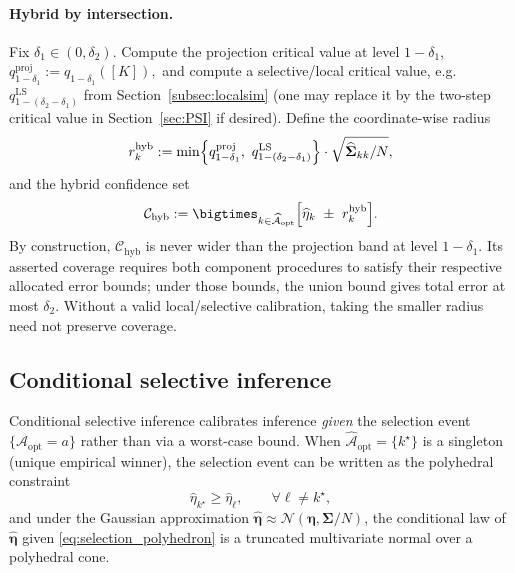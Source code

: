 \documentclass[12pt]{article}
\theoremstyle{remark}\newtheorem{remark}[theorem]{Remark}\theoremstyle{plain}
\begin{document}
\paragraph{Hybrid by intersection.}
Fix $\delta_1\in(0,\delta_2)$.
Compute the projection critical value at level $1-\delta_1$,
$
q^{\mathrm{proj}}_{1-\delta_1}:=q_{1-\delta_1}([K]),
$
and compute a selective/local critical value, e.g.\ $q^{\mathrm{LS}}_{1-(\delta_2-\delta_1)}$ from
Section~\ref{subsec:localsim} (one may replace it by the two-step critical value in
Section~\ref{sec:PSI} if desired). Define the coordinate-wise radius
\[
r_k^{\mathrm{hyb}}
:=
\min\Bigl\{
q^{\mathrm{proj}}_{1-\delta_1},\ q^{\mathrm{LS}}_{1-(\delta_2-\delta_1)}
\Bigr\}\cdot \sqrt{\widehat{\boldsymbol{\Sigma}}_{kk}/N},
\]
and the hybrid confidence set
\begin{equation*}\label{eq:CS_hybrid}
\mathcal{C}_{\mathrm{hyb}}
:=
\bigtimes_{k\in\widehat{\mathcal{A}}_{\mathrm{opt}}}
\Bigl[
\widehat{\eta}_k \ \pm\ r_k^{\mathrm{hyb}}
\Bigr].
\end{equation*}
By construction, $\mathcal{C}_{\mathrm{hyb}}$ is never wider than the
projection band at level $1-\delta_1$.  Its asserted coverage requires
both component procedures to satisfy their respective allocated error
bounds; under those bounds, the union bound gives total error at most
$\delta_2$.  Without a valid local/selective calibration, taking the
smaller radius need not preserve coverage.

\subsection{Conditional selective inference}\label{subsec:conditional}
Conditional selective inference calibrates inference \emph{given} the selection event
$\{\widehat{\mathcal{A}}_{\mathrm{opt}}=a\}$ rather than via a worst-case bound. When
$\widehat{\mathcal{A}}_{\mathrm{opt}}=\{k^\star\}$ is a singleton (unique empirical winner), the selection event
can be written as the polyhedral constraint
\begin{equation*}\label{eq:selection_polyhedron}
\widehat{\eta}_{k^\star} \ge \widehat{\eta}_\ell,\qquad \forall \ell\neq k^\star,
\end{equation*}
and under the Gaussian approximation
$\widehat{\bm{\eta}}\approx \mathcal{N}(\bm{\eta},\boldsymbol{\Sigma}/N)$, the conditional law of
$\widehat{\bm{\eta}}$ given \eqref{eq:selection_polyhedron} is a truncated multivariate normal over a polyhedral
cone.
\end{document}
